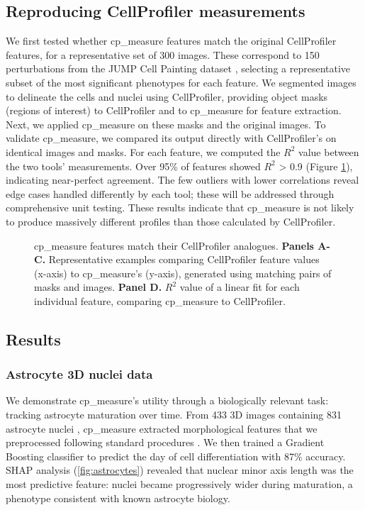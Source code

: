 \documentclass{article}
\begin{document}
\subsection{Reproducing CellProfiler measurements}
\label{sec:org09b0cd2}
We first tested whether cp\_measure features match the original CellProfiler features, for a representative set of 300 images. These correspond to 150 perturbations from the JUMP Cell Painting dataset \citep{chandrasekaranJUMPCellPainting2023}, selecting a representative subset of the most significant phenotypes for each feature. We segmented images to delineate the cells and nuclei using CellProfiler, providing object masks (regions of interest) to CellProfiler and to cp\_measure for feature extraction. Next, we applied cp\_measure on these masks and the original images. 
To validate cp\_measure, we compared its output directly with CellProfiler's on identical images and masks. 
For each feature, we computed the $R^2$ value between the two tools' measurements. 
Over 95\% of features showed $R^2$ > 0.9 (Figure \ref{fig:cp_vs_cpmeasure}), indicating near-perfect agreement. 
The few outliers with lower correlations reveal edge cases handled differently by each tool; these will be addressed through comprehensive unit testing. These results indicate that cp\_measure is not likely to produce massively different profiles than those calculated by CellProfiler.

\begin{figure}[htbp]
\centering

\caption{\label{fig:cp_vs_cpmeasure}cp\_measure features match their CellProfiler analogues. \textbf{Panels A-C.} Representative examples comparing CellProfiler feature values (x-axis) to cp\_measure's (y-axis), generated using matching pairs of masks and images. \textbf{Panel D.} \(R^2\) value of a linear fit for each individual feature, comparing cp\_measure to CellProfiler.}
\end{figure}

\subsection{Results}
\label{sec:orge5b5c6b}
\subsubsection{Astrocyte 3D nuclei data}
\label{sec:org447090b}

We demonstrate cp\_measure's utility through a biologically relevant task: tracking astrocyte maturation over time. 
From 433 3D images containing 831 astrocyte nuclei \citep{kalininValproicAcidinducedChanges2021}, cp\_measure extracted morphological features  that we preprocessed following standard procedures \citep{caicedoDataanalysisStrategiesImagebased2017}.
We then trained a Gradient Boosting classifier to predict the day of cell differentiation with 87\% accuracy. 
SHAP analysis \citep{sundararajanManyShapleyValues2020} (\ref{fig:astrocytes}) revealed that nuclear minor axis length was the most predictive feature: nuclei became progressively wider during maturation, a phenotype consistent with known astrocyte biology.
\end{document}
